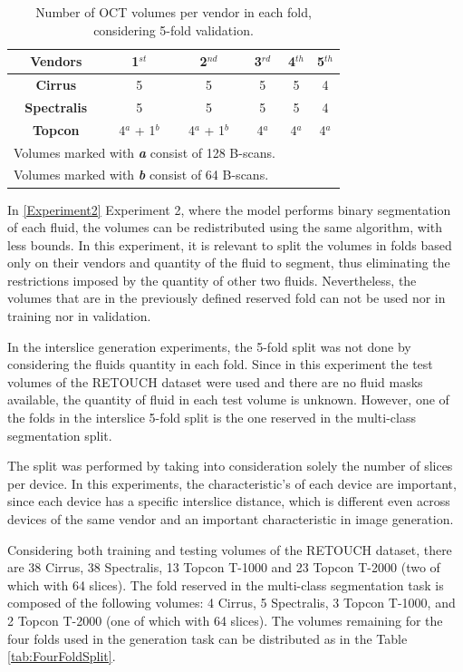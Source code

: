\begin{table}[!ht]
	\setlength{\tabcolsep}{6pt}
	\renewcommand{\arraystretch}{1.3}
	\caption{Number of OCT volumes per vendor in each fold, considering 5-fold validation.}
	\centering
	\begin{tabular}{|c|c|c|c|c|c|}
		\hline
		\textbf{Vendors} & \textbf{1$^{st}$} & \textbf{2$^{nd}$} & \textbf{3$^{rd}$} & \textbf{4$^{th}$} & \textbf{5$^{th}$} \\
		\hline
		\textbf{Cirrus} & 5 & 5 & 5 & 5 & 4 \\
		\textbf{Spectralis} & 5 & 5 & 5 & 5 & 4 \\
		\textbf{Topcon} & 4$^{a}$ + 1$^{b}$ & 4$^{a}$ + 1$^{b}$ & 4$^{a}$ & 4$^{a}$ & 4$^{a}$ \\
		\hline
		\multicolumn{4}{l}{Volumes marked with \textbf{\textit{a}} consist of 128 B-scans.} \\
		\multicolumn{4}{l}{Volumes marked with \textbf{\textit{b}} consist of 64 B-scans.}
	\end{tabular}
	\label{tab:FiveFoldSplit}
\end{table}

In \ref{Experiment2} Experiment 2, where the model performs binary segmentation of each fluid, the volumes can be redistributed using the same algorithm, with less bounds. In this experiment, it is relevant to split the volumes in folds based only on their vendors and quantity of the fluid to segment, thus eliminating the restrictions imposed by the quantity of other two fluids. Nevertheless, the volumes that are in the previously defined reserved fold can not be used nor in training nor in validation.
\par
In the interslice generation experiments, the 5-fold split was not done by considering the fluids quantity in each fold. Since in this experiment the test volumes of the RETOUCH dataset were used and there are no fluid masks available, the quantity of fluid in each test volume is unknown. However, one of the folds in the interslice 5-fold split is the one reserved in the multi-class segmentation split.
\par
The split was performed by taking into consideration solely the number of slices per device. In this experiments, the characteristic's of each device are important, since each device has a specific interslice distance, which is different even across devices of the same vendor and an important characteristic in image generation.
\par
Considering both training and testing volumes of the RETOUCH dataset, there are 38 Cirrus, 38 Spectralis, 13 Topcon T-1000 and 23 Topcon T-2000 (two of which with 64 slices). The fold reserved in the multi-class segmentation task is composed of the following volumes: 4 Cirrus, 5 Spectralis, 3 Topcon T-1000, and 2 Topcon T-2000 (one of which with 64 slices). The volumes remaining for the four folds used in the generation task can be distributed as in the Table \ref{tab:FourFoldSplit}.

